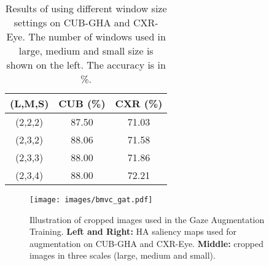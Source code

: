 \documentclass{bmvc2k}
\begin{document}
\begin{table}[h]
    \centering
        \begin{tabular}{c|c|c}
        \hline
         (L,M,S)  & CUB (\%) & CXR (\%) \\
        \hline\hline
(2,2,2) & 87.50  & 71.03 \\
        (2,3,2) & 88.06 & 71.58 \\
        (2,3,3) & 88.00 & 71.86\\
        (2,3,4) & 88.00  & 72.21 \\
\hline
        \end{tabular}
        \vspace*{0.5cm}
        \caption{Results of using different window size settings on CUB-GHA and CXR-Eye. The number of windows used in large, medium and small size is shown on the left. The accuracy is in \%.}
        \label{tab:window k}
\end{table}

\begin{figure}[h]
    \centering
    \texttt{[image: images/bmvc\_gat.pdf]}
     \vspace*{0.2cm}
    \caption{Illustration of cropped images used in the Gaze Augmentation Training. \textbf{Left and Right:} HA saliency maps used for augmentation on CUB-GHA and CXR-Eye. \textbf{Middle:} cropped images in three scales (large, medium and small).}
    \label{fig:GAT illustration}
\end{figure}
\end{document}
